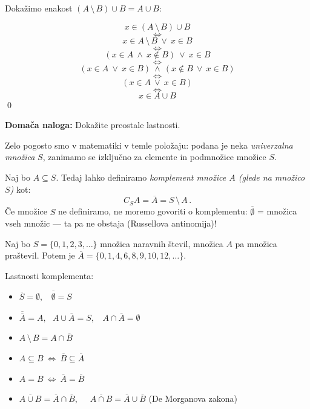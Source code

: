 \documentclass[11pt,paper=b5,DIV=13,headinclude,footinclude]{scrbook}
\newcounter{example}
\def\ali {{~\vee~}}
\def\inn {{~\wedge~}}
\def\brez {{\,\setminus\,}}
\def\cee {{~\Leftrightarrow~}}
\begin{document}
Dokažimo enakost $(A\brez B)\cup B = A\cup B$:

$$x\in (A\brez B)\cup B$$
$$\cee$$
$$x\in A\brez B \ali x\in B$$
$$\cee$$
$$(x\in A\inn x\not\in B) \ali x\in B$$
$$\cee$$
$$(x\in A\ali x\in B) \inn (x\not\in B \ali x\in B)$$
$$\cee$$
$$(x\in A\ali x\in B)$$
$$\cee$$
$$x\in A\cup B$$
\qed

\bigskip
\textbf{ Domača naloga:} Dokažite preostale lastnosti.

\bigskip



\bigskip

Zelo pogosto smo v matematiki v temle položaju: podana je neka {\em univerzalna množica} $S$, zanimamo se izključno za elemente in podmnožice množice $S$.

Naj bo $A\subseteq S$. Tedaj lahko definiramo {\em komplement množice $A$ (glede na množico $S$)} kot:
$$C_SA = \overline A = S\brez A\,.$$
Če množice $S$ ne definiramo, ne moremo govoriti o komplementu: $\overline \emptyset$ = množica vseh množic --- ta pa ne obstaja (Russellova antinomija)!

\bigskip
\begin{example*}
Naj bo $S = \{0,1,2,3,\ldots\}$ množica naravnih števil, množica $A$ pa množica praštevil.
Potem je $\overline A = \{0,1,4,6,8,9,10,12,\ldots\}$.

\end{example*}

\medskip

Lastnosti komplementa:
\begin{itemize}
  \item
$\overline S = \emptyset,~~~~\overline \emptyset = S$

  \item
$\overline{\overline A} = A,~~~A\cup \overline A = S,~~~~A\cap \overline A = \emptyset$

  \item
$A\brez B = A\cap \overline B$

  \item
$A\subseteq B \cee  \overline B \subseteq \overline A$

  \item
$A= B \cee  \overline A = \overline B$

  \item
$\overline{A\cup B} = \overline A\cap \overline B$,~~~$\overline{A\cap B} = \overline A\cup \overline B$ (De Morganova zakona)
\end{itemize}
\end{document}
